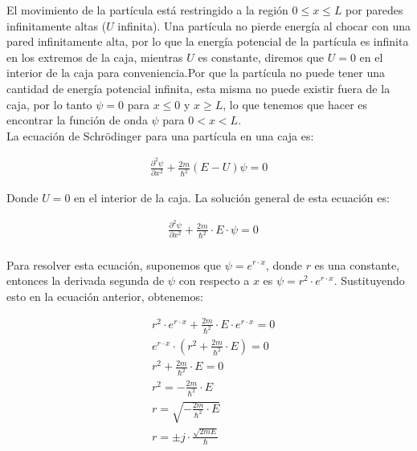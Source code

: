 \documentclass[a4paper]{article}
\begin{document}
        \indent El movimiento de la partícula está restringido a la región $0 \leq x \leq L$ por paredes infinitamente altas ($U$ infinita). Una partícula no pierde energía al chocar con una pared infinitamente alta, por lo que la energía potencial de la partícula es infinita en los extremos de la caja, mientras $U$ es constante, diremos que $ U = 0 $ en el interior de la caja para conveniencia.Por que la partícula no puede tener una cantidad de energía potencial infinita, esta misma no puede existir fuera de la caja, por lo tanto $ \psi = 0$ para $x \leq 0$ y $x \geq L$, lo que tenemos que hacer es encontrar la función de onda $\psi$ para $0 < x < L$.\\
        \indent La ecuación de Schrödinger para una partícula en una caja es:

        \begin{align*}
            \frac{\partial^2 \psi}  {\partial x^2 }+ \frac{2m}{\hbar^2} (E - U) \psi = 0
        \end{align*}

        \indent Donde $U = 0$ en el interior de la caja. La solución general de esta ecuación es:

        \begin{align*}
            &\frac{\partial^2 \psi} {\partial x^2} + \frac{2m}{\hbar^2} \cdot E \cdot \psi = 0 \\
        \end{align*}

        \indent Para resolver esta ecuación, suponemos que $\psi = e^{r \cdot x}$, donde $r$ es una constante, entonces la derivada segunda de $\psi$ con respecto a $x$ es $\psi = r^2 \cdot e^{r \cdot x}$. Sustituyendo esto en la ecuación anterior, obtenemos:

        \begin{align*}
            &r^2 \cdot e^{r \cdot x} + \frac{2m}{\hbar^2} \cdot E \cdot e^{r \cdot x} = 0 \\
            &e^{r \cdot x} \cdot (r^2 + \frac{2m}{\hbar^2} \cdot E) = 0 \\
            &r^2 + \frac{2m}{\hbar^2} \cdot E = 0 \\
            &r^2 = -\frac{2m}{\hbar^2} \cdot E \\
            &r = \sqrt{-\frac{2m}{\hbar^2} \cdot E} \\
            &r = \pm j \cdot \frac{\sqrt{2mE}}{\hbar}\\
        \end{align*}
\end{document}

